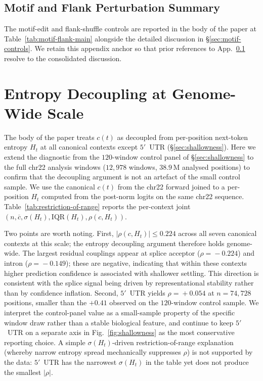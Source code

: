 \documentclass{article}
\theoremstyle{plain}
\theoremstyle{definition}
\theoremstyle{remark}
\begin{document}
\subsection{Motif and Flank Perturbation Summary}
\label{app:motif-flank}

The motif-edit and flank-shuffle controls are reported in the body of the paper at Table~\ref{tab:motif-flank-main} alongside the detailed discussion in \S\ref{sec:motif-controls}. We retain this appendix anchor so that prior references to App.~\ref{app:motif-flank} resolve to the consolidated discussion.

\section{Entropy Decoupling at Genome-Wide Scale}
\label{app:restriction-of-range}

The body of the paper treats $c(t)$ as decoupled from per-position
next-token entropy $H_t$ at all canonical contexts except $5'$~UTR
(\S\ref{sec:shallowness}). Here we extend the diagnostic from the
$120$-window control panel of \S\ref{sec:shallowness} to the full
chr22 analysis windows ($12{,}978$ windows, $38.9$\,M analysed positions)
to confirm that the decoupling argument is not an artefact of the
small control sample. We use the canonical $c(t)$ from the chr22 forward
joined to a per-position $H_t$ computed from the post-norm logits on
the same chr22 sequence. Table~\ref{tab:restriction-of-range} reports
the per-context joint $(n, \overline{c}, \sigma(H_t), \mathrm{IQR}(H_t),
\rho(c, H_t))$.

Two points are worth noting. First, $|\rho(c, H_t)|\!\le\!0.224$ across
all seven canonical contexts at this scale; the entropy decoupling
argument therefore holds genome-wide. The largest residual couplings
appear at splice acceptor ($\rho\!=\!-0.224$) and intron
($\rho\!=\!-0.149$); these are negative, indicating that within these contexts higher prediction confidence is associated with shallower settling. This direction is consistent with the splice signal being driven by representational stability rather than by confidence inflation. Second,
$5'$~UTR yields $\rho\!=\!+0.054$ at $n\!=\!74{,}728$ positions, smaller
than the $+0.41$ observed on the $120$-window control sample. We
interpret the control-panel value as a small-sample property of the
specific window draw rather than a stable biological feature, and
continue to keep $5'$~UTR on a separate axis in Fig.~\ref{fig:shallowness}
as the most conservative reporting choice. A simple
$\sigma(H_t)$-driven restriction-of-range explanation (whereby narrow
entropy spread mechanically suppresses $\rho$) is not supported by the
data: $5'$~UTR has the narrowest $\sigma(H_t)$ in the table yet does
not produce the smallest $|\rho|$.
\end{document}
